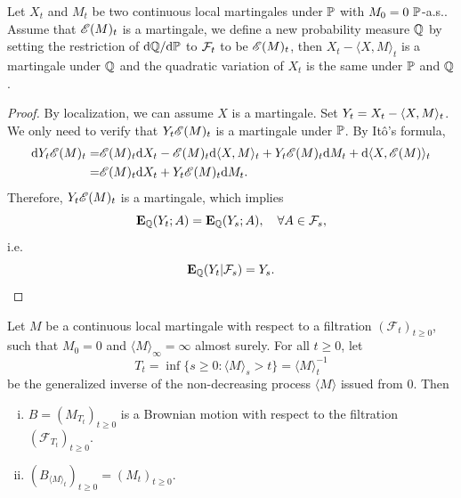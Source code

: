 	\begin{theorem}
		Let $X_t$ and $M_t$ be two continuous local martingales under ${\mathbb P}$ with $M_0=0 ~  {\mathbb P}$-a.s..  Assume that ${\mathscr E}(M)_t$ is a martingale, we define a new probability measure ${\mathbb Q}$ by setting the restriction of $\text{\rm{d}}{\mathbb Q}/\text{\rm{d}}{\mathbb P}$ to ${\mathcal F}_t$ to be ${\mathscr E}(M)_t$, then $X_t-\langle X, M \rangle_t$ is a martingale under ${\mathbb Q}$ and the quadratic variation of $X_t$ is the same under ${\mathbb P}$ and ${\mathbb Q}$. 
	\end{theorem}
	\begin{proof}
		By localization, we can assume $X$ is a martingale. Set $Y_t=X_t-\langle X,M\rangle_t$. We only need to verify that $Y_t{\mathscr E}(M)_t$ is a martingale under ${\mathbb P}$. By Itô's formula, 
		\[
		  \begin{aligned}
		  	\text{\rm{d}} Y_t {\mathscr E}(M)_t=& {\mathscr E}(M)_t \text{\rm{d}} X_t- {\mathscr E}(M)_t \text{\rm{d}} \langle X,M\rangle_t+ Y_t {\mathscr E}(M)_t \text{\rm{d}} M_t+ \text{\rm{d}} \langle X, {\mathscr E}(M)\rangle_t \\
		  	=& {\mathscr E}(M)_t \text{\rm{d}} X_t+ Y_t {\mathscr E}(M)_t \text{\rm{d}} M_t. 
		  \end{aligned}
		\]
		Therefore, $Y_t{\mathscr E}(M)_t$ is a martingale, which implies 
		$$
		    {\mathbf E}_{{\mathbb Q}} (Y_t; A) = {\mathbf E}_{{\mathbb Q}} (Y_s; A), \quad \forall A\in {\mathcal F}_s, 
		$$
		i.e. 
		\[
		    {\mathbf E}_{{\mathbb Q}}(Y_t|{\mathcal F}_s)= Y_s. 
		\]
	\end{proof}

\begin{theorem}\label{Thm:Dambis-Dubins-Schwarz}
    Let \( M \) be a continuous local martingale with respect to a filtration \( (\mathcal{F}_t)_{t \geq 0} \), such that \( M_0 = 0 \) and \( \langle M \rangle_\infty = \infty \) almost surely. For all \( t \geq 0 \), let
    \[
        T_t = \inf\{s \geq 0 : \langle M \rangle_s > t\} = \langle M \rangle_t^{-1}
    \]
    be the generalized inverse of the non-decreasing process \( \langle M \rangle \) issued from 0. Then
    \begin{enumerate}[(i)]
        \item \( B = (M_{T_t})_{t \geq 0} \) is a Brownian motion with respect to the filtration \( (\mathcal{F}_{T_t})_{t \geq 0} \).
        \item \( (B_{\langle M \rangle_t})_{t \geq 0} = (M_t)_{t \geq 0} \).
    \end{enumerate}
\end{theorem}

